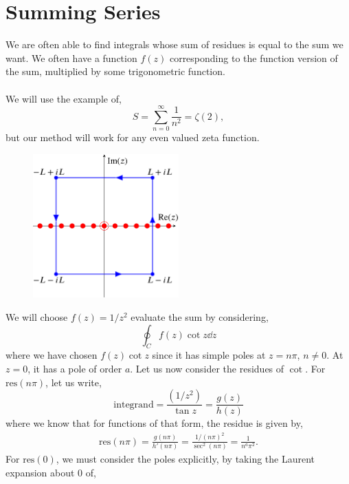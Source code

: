\documentclass{book}
\begin{document}
\section{Summing Series}
We are often able to find integrals whose sum of residues is equal to the sum we want. We often have a function $f(z)$ corresponding to the function version of the sum, multiplied by some trigonometric function.
\\\\
We will use the example of,
\begin{equation}
	S = \sum_{n=0}^{\infty}\frac{1}{n^2} = \zeta(2),
\end{equation}
but our method will work for any even valued zeta function.
\begin{figure}[h]
	\centering
	\includegraphics[width=0.5\textwidth]{summation.png}
	\caption{}
	\label{fig:summation}
\end{figure}
We will choose $f(z) = 1/z^2$ evaluate the sum by considering,
\begin{equation}
	\oint_C f(z)\cot z \dd z
\end{equation}
where we have chosen $f(z)\cot z$ since it has simple poles at $z = n\pi$, $n\neq0$. At $z=0$, it has a pole of order $a$. Let us now consider the residues of $\cot$. For $\text{res}(n\pi)$, let us write,
\begin{equation}
	\text{integrand} = \frac{(1/z^2)}{\tan z} = \frac{g(z)}{h(z)}
\end{equation}
where we know that for functions of that form, the residue is given by,
\begin{equation}
	\begin{split}
		\text{res}(n\pi) = \frac{g(n\pi)}{h'(n\pi)} = \frac{1/(n\pi)^2}{\sec^2(n\pi)} = \frac{1}{n^a\pi^2}.
	\end{split}
\end{equation}
For $\text{res}(0)$, we must consider the poles explicitly, by taking the Laurent expansion about 0 of,
\end{document}

